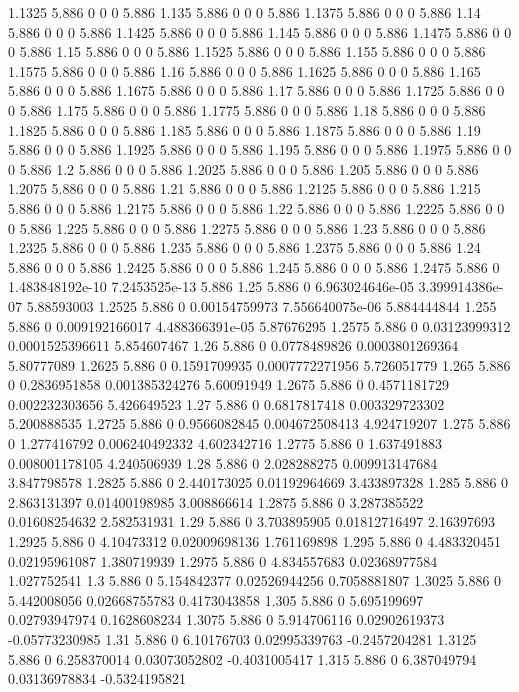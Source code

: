 {1.1325 5.886 0 0 0 5.886
1.135 5.886 0 0 0 5.886
1.1375 5.886 0 0 0 5.886
1.14 5.886 0 0 0 5.886
1.1425 5.886 0 0 0 5.886
1.145 5.886 0 0 0 5.886
1.1475 5.886 0 0 0 5.886
1.15 5.886 0 0 0 5.886
1.1525 5.886 0 0 0 5.886
1.155 5.886 0 0 0 5.886
1.1575 5.886 0 0 0 5.886
1.16 5.886 0 0 0 5.886
1.1625 5.886 0 0 0 5.886
1.165 5.886 0 0 0 5.886
1.1675 5.886 0 0 0 5.886
1.17 5.886 0 0 0 5.886
1.1725 5.886 0 0 0 5.886
1.175 5.886 0 0 0 5.886
1.1775 5.886 0 0 0 5.886
1.18 5.886 0 0 0 5.886
1.1825 5.886 0 0 0 5.886
1.185 5.886 0 0 0 5.886
1.1875 5.886 0 0 0 5.886
1.19 5.886 0 0 0 5.886
1.1925 5.886 0 0 0 5.886
1.195 5.886 0 0 0 5.886
1.1975 5.886 0 0 0 5.886
1.2 5.886 0 0 0 5.886
1.2025 5.886 0 0 0 5.886
1.205 5.886 0 0 0 5.886
1.2075 5.886 0 0 0 5.886
1.21 5.886 0 0 0 5.886
1.2125 5.886 0 0 0 5.886
1.215 5.886 0 0 0 5.886
1.2175 5.886 0 0 0 5.886
1.22 5.886 0 0 0 5.886
1.2225 5.886 0 0 0 5.886
1.225 5.886 0 0 0 5.886
1.2275 5.886 0 0 0 5.886
1.23 5.886 0 0 0 5.886
1.2325 5.886 0 0 0 5.886
1.235 5.886 0 0 0 5.886
1.2375 5.886 0 0 0 5.886
1.24 5.886 0 0 0 5.886
1.2425 5.886 0 0 0 5.886
1.245 5.886 0 0 0 5.886
1.2475 5.886 0 1.483848192e-10 7.2453525e-13 5.886
1.25 5.886 0 6.963024646e-05 3.399914386e-07 5.88593003
1.2525 5.886 0 0.00154759973 7.556640075e-06 5.884444844
1.255 5.886 0 0.009192166017 4.488366391e-05 5.87676295
1.2575 5.886 0 0.03123999312 0.0001525396611 5.854607467
1.26 5.886 0 0.0778489826 0.0003801269364 5.80777089
1.2625 5.886 0 0.1591709935 0.0007772271956 5.726051779
1.265 5.886 0 0.2836951858 0.001385324276 5.60091949
1.2675 5.886 0 0.4571181729 0.002232303656 5.426649523
1.27 5.886 0 0.6817817418 0.003329723302 5.200888535
1.2725 5.886 0 0.9566082845 0.004672508413 4.924719207
1.275 5.886 0 1.277416792 0.006240492332 4.602342716
1.2775 5.886 0 1.637491883 0.008001178105 4.240506939
1.28 5.886 0 2.028288275 0.009913147684 3.847798578
1.2825 5.886 0 2.440173025 0.01192964669 3.433897328
1.285 5.886 0 2.863131397 0.01400198985 3.008866614
1.2875 5.886 0 3.287385522 0.01608254632 2.582531931
1.29 5.886 0 3.703895905 0.01812716497 2.16397693
1.2925 5.886 0 4.10473312 0.02009698136 1.761169898
1.295 5.886 0 4.483320451 0.02195961087 1.380719939
1.2975 5.886 0 4.834557683 0.02368977584 1.027752541
1.3 5.886 0 5.154842377 0.02526944256 0.7058881807
1.3025 5.886 0 5.442008056 0.02668755783 0.4173043858
1.305 5.886 0 5.695199697 0.02793947974 0.1628608234
1.3075 5.886 0 5.914706116 0.02902619373 -0.05773230985
1.31 5.886 0 6.10176703 0.02995339763 -0.2457204281
1.3125 5.886 0 6.258370014 0.03073052802 -0.4031005417
1.315 5.886 0 6.387049794 0.03136978834 -0.5324195821
}
